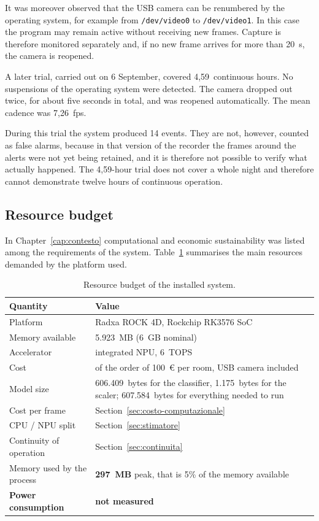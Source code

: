 It was moreover observed that the USB camera can be renumbered by the operating system, for example from \texttt{/dev/video0} to \texttt{/dev/video1}. In this case the program may remain active without receiving new frames. Capture is therefore monitored separately and, if no new frame arrives for more than 20~s, the camera is reopened.

A later trial, carried out on 6 September, covered 4,59~continuous hours. No suspensions of the operating system were detected. The camera dropped out twice, for about five seconds in total, and was reopened automatically. The mean cadence was 7,26~fps.

During this trial the system produced 14 events. They are not, however, counted as false alarms, because in that version of the recorder the frames around the alerts were not yet being retained, and it is therefore not possible to verify what actually happened. The 4,59-hour trial does not cover a whole night and therefore cannot demonstrate twelve hours of continuous operation.

\subsection{Resource budget}
\label{sec:risorse}

In Chapter~\ref{cap:contesto} computational and economic sustainability was listed among the requirements of the system. Table~\ref{tab:risorse} summarises the main resources demanded by the platform used.

\begin{table}[htbp]
\centering
\caption{Resource budget of the installed system.}
\label{tab:risorse}
\begin{tabular}{@{}p{4.6cm}p{9.0cm}@{}}
\toprule
\textbf{Quantity} & \textbf{Value} \\
\midrule
Platform & Radxa ROCK 4D, Rockchip RK3576 SoC \\
Memory available & 5.923~MB (6~GB nominal) \\
Accelerator & integrated NPU, 6~TOPS \\
Cost & of the order of 100~\euro{} per room, USB camera included \\
Model size & 606.409~bytes for the classifier, 1.175~bytes for the scaler; 607.584~bytes for everything needed to run \\
Cost per frame & Section~\ref{sec:costo-computazionale} \\
CPU / NPU split & Section~\ref{sec:stimatore} \\
Continuity of operation & Section~\ref{sec:continuita} \\
Memory used by the process & \textbf{297~MB} peak, that is 5\% of the memory available \\
\midrule
\textbf{Power consumption} & \textbf{not measured} \\
\bottomrule
\end{tabular}
\end{table}

